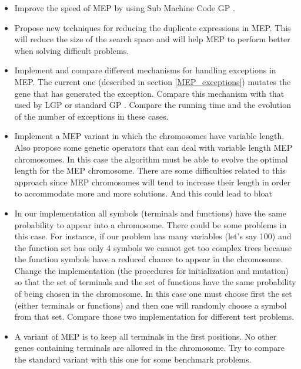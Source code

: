 \documentclass [11pt]{article}
\begin{document}
\begin{itemize}

\item{Improve the speed of MEP by using Sub Machine Code GP \cite{poli1,poli2}.}


\item{Propose new techniques for reducing the duplicate expressions in MEP. This will reduce the size of the search space and will help MEP to perform better when solving difficult problems.}

\item{Implement and compare different mechanisms for handling exceptions in MEP. The current one (described in section \ref{MEP_exceptions}) mutates the gene that has generated the exception. Compare this mechanism with that used by LGP \cite{brameier1} or standard GP \cite{koza1}. Compare the running time and the evolution of the number of exceptions in these cases.
}

\item{Implement a MEP variant in which the chromosomes have variable length. Also propose some genetic operators that can deal with variable length MEP chromosomes. In this case the algorithm must be able to evolve the optimal length for the MEP chromosome. There are some difficulties related to this approach since MEP chromosomes will tend to increase their length in order to accommodate more and more solutions. And this could lead to bloat }

\item{In our implementation all symbols (terminals and functions) have the same probability to appear into a chromosome. There could be some problems in this case. For instance, if our problem has many variables (let's say 100) and the function set has only 4 symbols we cannot get too complex trees because the function symbols have a reduced chance to appear in the chromosome. Change the implementation (the procedures for initialization and mutation) so that the set of terminals and the set of functions have the same probability of being chosen in the chromosome. In this case one must choose first the set (either terminals or functions) and then one will randomly choose a symbol from that set. Compare those two implementation for different test problems.
}

\item{A variant of MEP is to keep all terminals in the first positions. No other genes containing terminals are allowed in the chromosome. Try to compare the standard variant with this one for some benchmark problems.
}

\end{itemize}



\end{document}
